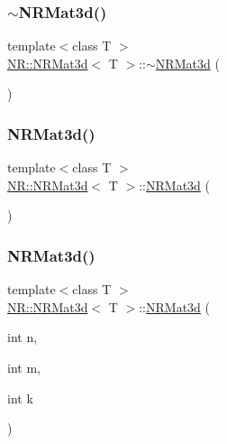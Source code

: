 \subsubsection{\texorpdfstring{$\sim$NRMat3d()}{~NRMat3d()}\hspace{0.1cm}{\footnotesize\ttfamily [1/2]}}
{\footnotesize\ttfamily template$<$class T $>$ \\
\mbox{\hyperlink{classNR_1_1NRMat3d}{N\+R\+::\+N\+R\+Mat3d}}$<$ T $>$\+::$\sim$\mbox{\hyperlink{classNR_1_1NRMat3d}{N\+R\+Mat3d}} (\begin{DoxyParamCaption}{ }\end{DoxyParamCaption})}

\mbox{\label{classNR_1_1NRMat3d_a92498ec487349e85209cfad66e6b7d4e}} 
\subsubsection{\texorpdfstring{NRMat3d()}{NRMat3d()}\hspace{0.1cm}{\footnotesize\ttfamily [3/4]}}
{\footnotesize\ttfamily template$<$class T $>$ \\
\mbox{\hyperlink{classNR_1_1NRMat3d}{N\+R\+::\+N\+R\+Mat3d}}$<$ T $>$\+::\mbox{\hyperlink{classNR_1_1NRMat3d}{N\+R\+Mat3d}} (\begin{DoxyParamCaption}{ }\end{DoxyParamCaption})}

\mbox{\label{classNR_1_1NRMat3d_a72437875f6affe5898dee887c3ebfe4c}} 
\subsubsection{\texorpdfstring{NRMat3d()}{NRMat3d()}\hspace{0.1cm}{\footnotesize\ttfamily [4/4]}}
{\footnotesize\ttfamily template$<$class T $>$ \\
\mbox{\hyperlink{classNR_1_1NRMat3d}{N\+R\+::\+N\+R\+Mat3d}}$<$ T $>$\+::\mbox{\hyperlink{classNR_1_1NRMat3d}{N\+R\+Mat3d}} (\begin{DoxyParamCaption}\item[{int}]{n,  }\item[{int}]{m,  }\item[{int}]{k }\end{DoxyParamCaption})}

